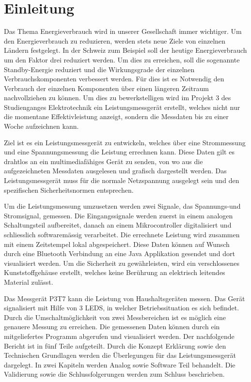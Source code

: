 \section{Einleitung}

Das Thema Energieverbrauch wird in unserer Gesellschaft immer wichtiger. Um den Energieverbrauch zu reduzieren, werden stets neue Ziele von einzelnen Ländern festgelegt. In der Schweiz zum Beispiel soll der heutige Energieverbrauch um den Faktor drei reduziert werden. Um dies zu erreichen, soll die sogenannte Standby-Energie reduziert und die Wirkungsgrade der einzelnen Verbrauchskomponenten verbessert werden. Für dies ist es Notwendig den Verbrauch der einzelnen Komponenten über einen längeren Zeitraum nachvollziehen zu können. Um dies zu bewerkstelligen wird im Projekt 3 des Studienganges Elektrotechnik ein Leistungsmessgerät erstellt, welches nicht nur die momentane Effektivleistung anzeigt, sondern die Messdaten bis zu einer Woche aufzeichnen kann.  

Ziel ist es ein Leistungsmessgerät zu entwickeln, welches über eine Strommessung und eine Spannungsmessung die Leistung errechnen kann. Diese Daten gilt es drahtlos an ein multimediafähiges Gerät zu senden, von wo aus die aufgezeichneten Messdaten ausgelesen und grafisch dargestellt werden. Das Leistungsmessgerät muss für die normale Netzspannung ausgelegt sein und den spezifischen Sicherheitsnormen entsprechen.

Um die Leistungsmessung umzusetzen werden zwei Signale, das Spannungs-und Stromsignal, gemessen. Die Eingangssignale werden zuerst in einem analogen Schaltungsteil aufbereitet, danach an einem Mikrocontroller digitalisiert und schliesslich softwaremässig verarbeitet. Die errechnete Leistung wird zusammen mit einem Zeitstempel lokal abgespeichert. Diese Daten können auf Wunsch durch eine Bluetooth Verbindung an eine Java Applikation gesendet und dort visualisiert werden. Um die Sicherheit zu gewährleisten, wird ein verschlossenes Kunststoffgehäuse erstellt, welches keine Berührung an elektrisch leitendes Material zulässt.

Das Messgerät P3T7 kann die Leistung von Haushaltsgeräten messen. Das Gerät signalisiert mit Hilfe von 3 LEDS, in welcher Betriebssituation es sich befindet. Durch die Umschaltmöglichkeit von zwei Messbereichen ist es möglich eine genauere Messung zu erreichen. Die gemessenen Daten können durch ein mitgeliefertes Programm abgerufen und visualisiert werden. 
Der nachfolgende Bericht ist in fünf Teile aufgeteilt. Durch die Konzept Erklärung sowie den Technischen Grundlagen werden die Überlegungen für das Leistungsmessgerät dargelegt. In zwei Kapiteln werden Analog sowie Software Teil behandelt. Die Validierung sowie die Schlussfolgerungen werden zum Schluss beschrieben. 


\pagebreak